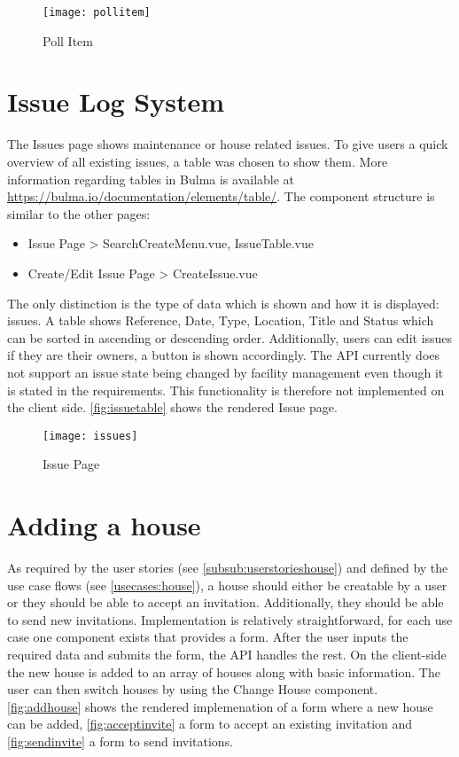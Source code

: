\begin{figure}[H]
  \begin{center}
  \texttt{[image: pollitem]}
  \end{center}
  \caption{Poll Item}
  \label{fig:pollitem}
\end{figure}

\section{Issue Log System}
The Issues page shows maintenance or house related issues. To give users a quick overview of all existing issues, a table was chosen to show them. More information regarding tables in Bulma is available at \url{https://bulma.io/documentation/elements/table/}. The component structure is similar to the other pages: \newline

\begin{itemize}
  \item Issue Page > SearchCreateMenu.vue, IssueTable.vue
  \item Create/Edit Issue Page > CreateIssue.vue
\end{itemize}

The only distinction is the type of data which is shown and how it is displayed: issues. A table shows Reference, Date,  Type, Location, Title and Status which can be sorted in ascending or descending order. Additionally, users can edit issues if they are their owners, a button is shown accordingly. The API currently does not support an issue state being changed by facility management even though it is stated in the requirements. This functionality is therefore not implemented on the client side. \autoref{fig:issuetable} shows the rendered Issue page.

\begin{figure}[H]
  \begin{center}
  \texttt{[image: issues]}
  \end{center}
  \caption{Issue Page}
  \label{fig:issuetable}
\end{figure}

\section{Adding a house}
As required by the user stories (see \autoref{subsub:userstorieshouse}) and defined by the use case flows (see \autoref{usecases:house}), a house should either be creatable by a user or they should be able to accept an invitation. Additionally, they should be able to send new invitations. Implementation is relatively straightforward, for each use case one component exists that provides a form. After the user inputs the required data and submits the form, the API handles the rest. On the client-side the new house is added to an array of houses along with basic information. The user can then switch houses by using the Change House component. \autoref{fig:addhouse} shows the rendered implemenation of a form where a new house can be added, \autoref{fig:acceptinvite} a form to accept an existing invitation and \autoref{fig:sendinvite} a form to send invitations.

